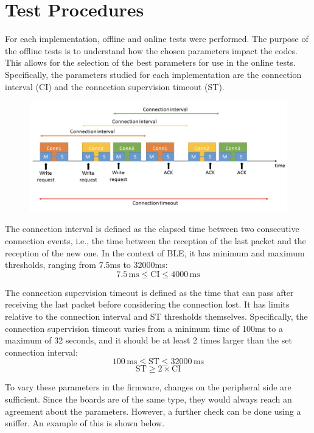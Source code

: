 \documentclass{Configuration_Files/PoliMi3i_thesis}
\begin{document}
\section{Test Procedures}

For each implementation, offline and online tests were performed. The purpose of the offline tests is to understand how the chosen parameters impact the codes. This allows for the selection of the best parameters for use in the online tests. Specifically, the parameters studied for each implementation are the connection interval (CI) and the connection supervision timeout (ST).

\begin{figure}[H]
    \centering
    \includegraphics[scale=0.6]{Test_Procedure/1.png}
    \label{connection_interval_timeout}
\end{figure}

The connection interval is defined as the elapsed time between two consecutive connection events, i.e., the time between the reception of the last packet and the reception of the new one. In the context of BLE, it has minimum and maximum thresholds, ranging from 7.5ms to 32000ms:
\[
7.5\,\text{ms} \leq \text{CI} \leq 4000\,\text{ms}
\]

The connection supervision timeout is defined as the time that can pass after receiving the last packet before considering the connection lost. It has limits relative to the connection interval and ST thresholds themselves. Specifically, the connection supervision timeout varies from a minimum time of 100ms to a maximum of 32 seconds, and it should be at least 2 times larger than the set connection interval:
\[
100\,\text{ms} \leq \text{ST} \leq 32000\,\text{ms}
\]
\[
\text{ST} \geq 2 \times \text{CI}
\]

To vary these parameters in the firmware, changes on the peripheral side are sufficient. Since the boards are of the same type, they would always reach an agreement about the parameters. However, a further check can be done using a sniffer. An example of this is shown below.
\end{document}
